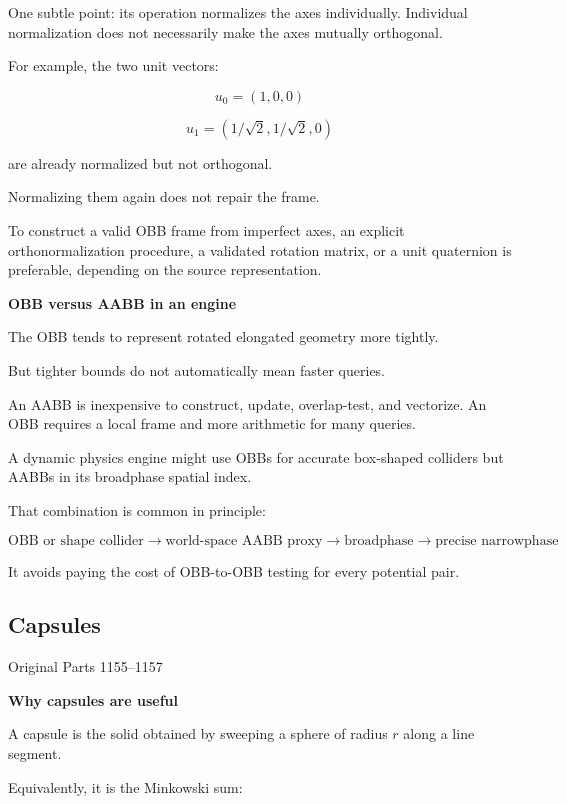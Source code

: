 One subtle point: its  operation normalizes the axes individually. Individual normalization does not necessarily make the axes mutually orthogonal.

For example, the two unit vectors:

\[
u_0=(1,0,0)
\]

\[
u_1=(1/\sqrt2,1/\sqrt2,0)
\]

are already normalized but not orthogonal.

Normalizing them again does not repair the frame.

To construct a valid OBB frame from imperfect axes, an explicit orthonormalization procedure, a validated rotation matrix, or a unit quaternion is preferable, depending on the source representation.

\textbf{OBB versus AABB in an engine}

The OBB tends to represent rotated elongated geometry more tightly.

But tighter bounds do not automatically mean faster queries.

An AABB is inexpensive to construct, update, overlap-test, and vectorize. An OBB requires a local frame and more arithmetic for many queries.

A dynamic physics engine might use OBBs for accurate box-shaped colliders but AABBs in its broadphase spatial index.

That combination is common in principle:

\[
\text{OBB or shape collider} \rightarrow \text{world-space AABB proxy} \rightarrow \text{broadphase} \rightarrow \text{precise narrowphase}
\]

It avoids paying the cost of OBB-to-OBB testing for every potential pair.

\subsection{Capsules}\label{03-visual-computing-i-ch021-capsules}

\hypertarget{03-visual-computing-i-ch021-capsules}{}

Original Parts 1155--1157

\textbf{Why capsules are useful}

A capsule is the solid obtained by sweeping a sphere of radius \(r\) along a line segment.

Equivalently, it is the Minkowski sum:

